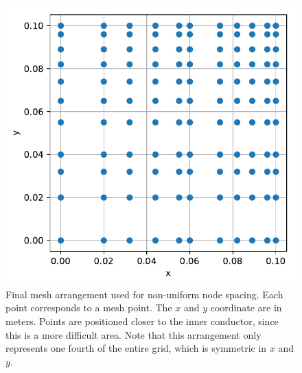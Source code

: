 \documentclass[a4paper,titlepage]{article}
\begin{document}
	\begin{figure}[!htb]
		\centering
		\includegraphics[width=\columnwidth]{plots/q3e.pdf}
		\caption
		{Final mesh arrangement used for non-uniform node spacing. Each point corresponds to a mesh point. The $x$ and $y$ coordinate are in meters. Points are positioned closer to the inner conductor, since this is a more difficult area. Note that this arrangement only represents one fourth of the entire grid, which is symmetric in $x$ and $y$.}
		\label{fig:q3e}
	\end{figure}
	
	\onecolumn
	
	
\end{document}
